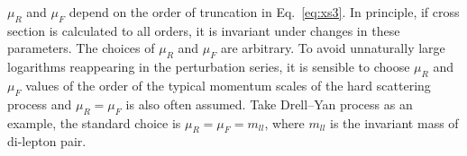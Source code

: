 $\mu_{R}$ and $\mu_{F}$ depend on the order of truncation in Eq.~\ref{eq:xs3}.
In principle, if cross section is calculated to all orders, it is invariant under changes in these parameters.
The choices of $\mu_{R}$ and $\mu_{F}$ are arbitrary. 
To avoid unnaturally large logarithms reappearing in the perturbation series,
it is sensible to choose $\mu_{R}$ and $\mu_{F}$ values of the order of the typical momentum scales of
the hard scattering process and $\mu_{R} = \mu_{F}$ is also often assumed.
Take Drell–Yan process as an example, the standard choice is $\mu_{R} = \mu_{F} = m_{ll}$, 
where $m_{ll}$ is the invariant mass of di-lepton pair.
